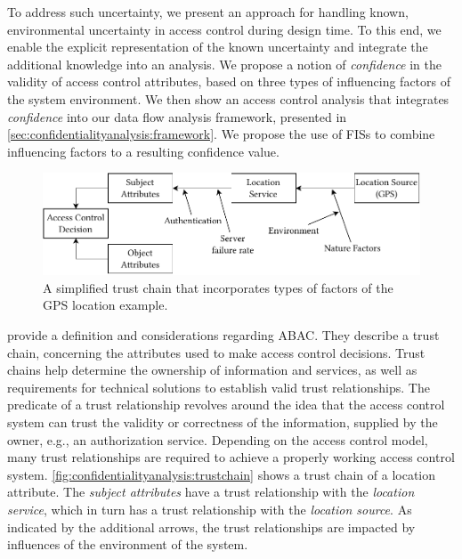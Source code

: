 To address such uncertainty, we present an approach for handling known, environmental uncertainty in access control during design time.
To this end, we enable the explicit representation of the known uncertainty and integrate the additional knowledge into an analysis. 
We propose a notion of \emph{confidence} in the validity of access control attributes, based on three types of influencing factors of the system environment.
We then show an access control analysis that integrates \emph{confidence} into our data flow analysis framework, presented in \autoref{sec:confidentialityanalysis:framework}. 
We propose the use of \acfp{FIS} \cite{klir_fuzzy_1995} to combine influencing factors to a resulting confidence value.

\begin{figure}
    \centering
    \includegraphics[width=\linewidth]{figures/chapter7/trustchain.pdf}
    \caption{A simplified trust chain that incorporates types of factors of the GPS location example.}
    \label{fig:confidentialityanalysis:trustchain}
\end{figure}

\textcite{hu_guide_2014} provide a definition and considerations regarding \acf{ABAC}. 
They describe a trust chain, concerning the attributes used to make access control decisions. 
Trust chains help determine the ownership of information and services, as well as requirements for technical solutions to establish valid trust relationships. 
The predicate of a trust relationship revolves around the idea that the access control system can trust the validity or correctness of the information, supplied by the owner, e.g., an authorization service. 
Depending on the access control model, many trust relationships are required to achieve a properly working access control system.
\autoref{fig:confidentialityanalysis:trustchain} shows a trust chain of a location attribute. 
The \emph{subject attributes} have a trust relationship with the \emph{location service}, which in turn has a trust relationship with the \emph{location source}. 
As indicated by the additional arrows, the trust relationships are impacted by influences of the environment of the system.

